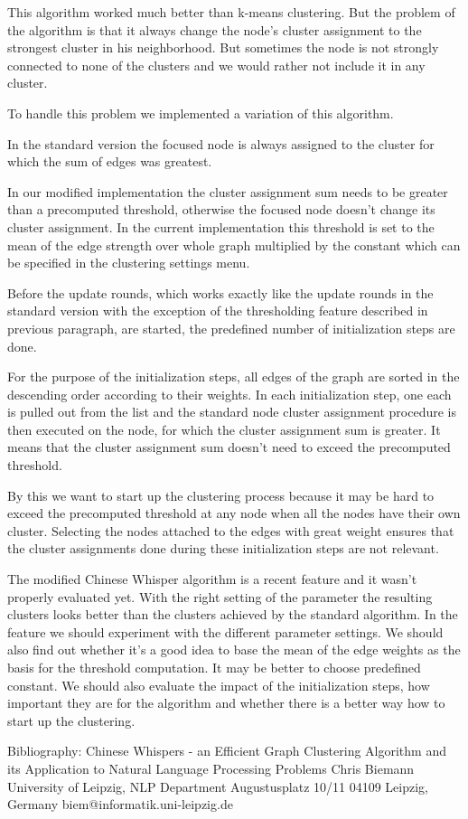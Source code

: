This algorithm worked much better than k-means clustering. But the problem of the algorithm is that it always change the node's cluster assignment to the strongest cluster in his neighborhood. But sometimes the node is not strongly connected to none of the clusters and we would rather not include it in any cluster.

To handle this problem we implemented a variation of this algorithm. 

In the standard version the focused node is always assigned to the cluster for which the sum of edges was greatest. 

In our modified implementation the cluster assignment sum needs to be greater than a precomputed threshold, otherwise the focused node doesn't change its cluster assignment. In the current implementation this threshold is set to the mean of the edge strength over whole graph multiplied by the constant which can be specified in the clustering settings menu.

Before the update rounds, which works exactly like the update rounds in the standard version with the exception of the thresholding feature described in previous paragraph, are started, the predefined number of initialization steps are done.

For the purpose of the initialization steps, all edges of the graph are sorted in the descending order according to their weights. In each initialization step, one each is pulled out from the list and the standard node cluster assignment procedure is then executed on the node, for which the cluster assignment sum is greater. It means that the cluster assignment sum doesn't need to exceed the precomputed threshold.

By this we want to start up the clustering process because it may be hard to exceed the precomputed threshold at any node when all the nodes have their own cluster. Selecting the nodes attached to the edges with great weight ensures that the cluster assignments done during these initialization steps are not relevant.

The modified Chinese Whisper algorithm is a recent feature and it wasn't properly evaluated yet. With the right setting of the parameter the resulting clusters looks better than the clusters achieved by the standard algorithm. In the feature we should experiment with the different parameter settings. We should also find out whether it's a good idea to base the mean of the edge weights as the basis for the threshold computation. It may be better to choose predefined constant. We should also evaluate the impact of the initialization steps, how important they are for the algorithm and whether there is a better way how to start up the clustering.

Bibliography:
Chinese Whispers - an Efficient Graph Clustering Algorithm
and its Application to Natural Language Processing Problems
                            Chris Biemann
                University of Leipzig, NLP Department
                         Augustusplatz 10/11
                      04109 Leipzig, Germany
              biem@informatik.uni-leipzig.de


